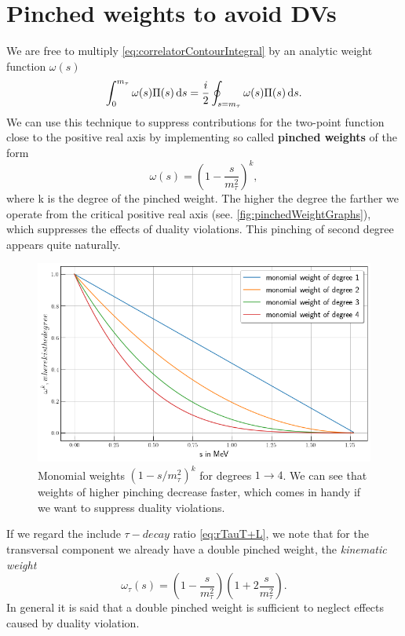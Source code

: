 \documentclass[../../index.tex]{subfiles}
\begin{document}
\section{Pinched weights to avoid DVs}
We are free to multiply \cref{eq:correlatorContourIntegral} by an analytic weight function $\omega(s)$
\begin{equation}
  \int_0^{m_\tau} \omega(s) \Pi(s) \dif s = \frac{i}{2} \oint_{s=m_\tau} \omega(s) \Pi(s) \dif s.
\end{equation}
We can use this technique to suppress contributions for the two-point function
close to the positive real axis by implementing so called \textbf{pinched
  weights} of the form
\begin{equation}
  \omega(s) = (1-\frac{s}{m_\tau^2})^k,
\end{equation}
where k is the degree of the pinched weight. The higher the degree the farther
we operate from the critical positive real axis (see. \cref{fig:pinchedWeightGraphs}), which suppresses the effects of
duality violations. This pinching of second degree appears quite naturally.
\begin{figure}
  \centering
  \includegraphics[width=\textwidth]{./images/monomialWeightGraphs.png}
  \caption{Monomial weights $(1-s/m_\tau^2)^k$ for degrees $1\to4$. We can see
    that weights of higher pinching decrease faster, which comes in handy if we
  want to suppress duality violations.}
  \label{fig:monomialWeightGraphs}
\end{figure}
If we regard the include $\tau-decay$ ratio \cref{eq:rTauT+L}, we note that for the
transversal component we already have a double pinched weight, the
\textit{kinematic weight}
\begin{equation}
  \label{eq:kinematicWeight}
  \omega_\tau(s) = \left( 1-\frac{s}{m_\tau^2} \right) \left( 1 + 2 \frac{s}{m_\tau^2} \right).
\end{equation}
In general it is said that a double pinched weight is sufficient to neglect
effects caused by duality violation.
\end{document}

